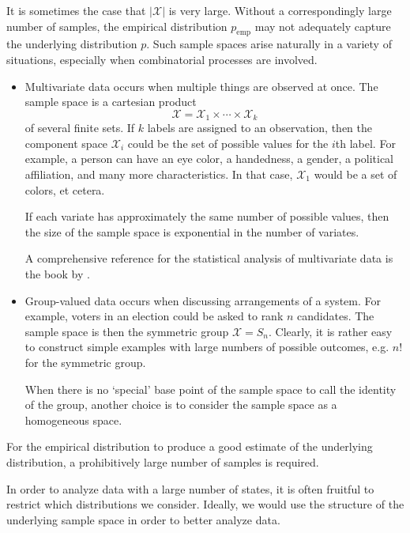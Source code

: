 \documentclass[cclicense]{hmcthesis}
\providecommand*{\xs}{\mathcal X}
\newcommand*{\emp}{\mathrm{emp}}
\numberwithin{equation}{chapter}
\numberwithin{thmcounter}{chapter}
\begin{document}
    It is sometimes the case that $|\xs|$ is very large.  Without a
    correspondingly large number of samples, the empirical distribution $p_\emp$
    may not adequately capture the underlying distribution $p$.  Such sample
    spaces arise naturally in a variety of situations, especially when
    combinatorial processes are involved.
    \begin{itemize}
    \item Multivariate data occurs when multiple things are observed at once.
    The sample space is a cartesian product
    \[
        \xs = \xs_1 \times \cdots \times \xs_k
    \]
    of several finite sets.  If $k$ labels are assigned to an observation, then
    the component space $\xs_i$ could be the set of possible values for the
    $i$th label.  For example, a person can have an eye color, a handedness, a
    gender, a political affiliation, and many more characteristics. In that
    case, $\xs_1$ would be a set of colors, et cetera.
    
    If each variate has approximately the same number of possible values, then
    the size of the sample space is exponential in the number of variates.  

    A comprehensive reference for the statistical analysis of multivariate data
    is the book by \citet{DMA}.

    \item Group-valued data occurs when discussing arrangements of a system.
    For example, voters in an election could be asked to rank $n$ candidates.
    The sample space is then the symmetric group $\xs = S_n$.  Clearly, it is
    rather easy to construct simple examples with large numbers of possible
    outcomes, e.g. $n!$ for the symmetric group.
    
    When there is no `special' base point of the sample space to call the
    identity of the group, another choice is to consider the sample space as a
    homogeneous space.

    \end{itemize}
    For the empirical distribution to produce a good estimate of the underlying
    distribution, a prohibitively large number of samples is required.

    In order to analyze data with a large number of states, it is often fruitful
    to restrict which distributions we consider.  Ideally, we would use the
    structure of the underlying sample space in order to better analyze data.
\end{document}
